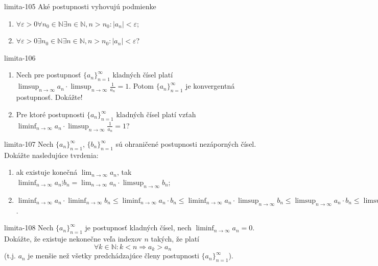 \begin{defproblem}{limita-105}
Aké postupnosti vyhovujú podmienke
\begin{enumerate}
\item $\forall \varepsilon >0 \forall n_0 \in \mathbb{N} \exists n \in \mathbb{N},n>n_0: |a_n|< \varepsilon$;
\item $\forall \varepsilon >0 \exists n_0 \in \mathbb{N} \exists n \in \mathbb{N},n>n_0: |a_n|< \varepsilon$?
\end{enumerate}
\end{defproblem}

\begin{defproblem}{limita-106}
\begin{enumerate}
\item Nech pre postupnosť ${\{a_n\}}_{n=1}^\infty$ kladných čísel platí $\limsup_{n \rightarrow \infty} a_n \cdot \limsup_{n \rightarrow \infty} \frac{1}{a_n}=1$. Potom ${\{a_n\}}_{n=1}^\infty$ je konvergentná postupnosť. Dokážte!
\item Pre ktoré postupnosti ${\{a_n\}}_{n=1}^\infty$ kladných čísel platí vzťah $\liminf_{n \rightarrow \infty} a_n \cdot \limsup_{n \rightarrow \infty} \frac{1}{a_n}=1$?
\end{enumerate}
\end{defproblem}

\begin{defproblem}{limita-107}
Nech ${\{a_n\}}_{n=1}^\infty$, ${\{b_n\}}_{n=1}^\infty$ sú ohraničené postupnosti nezáporných čísel. Dokážte nasledujúce tvrdenia:
\begin{enumerate}
\item ak existuje konečná $\lim_{n \rightarrow \infty} a_n$, tak $\liminf_{n \rightarrow \infty} a_n \vdots b_n=\lim_{n \rightarrow \infty} a_n \cdot \limsup_{n \rightarrow \infty} b_n$;
\item $\liminf_{n \rightarrow \infty} a_n \cdot \liminf_{n \rightarrow \infty} b_n \leq \liminf_{n \rightarrow \infty} a_n \cdot b_n \leq \liminf_{n \rightarrow \infty} a_n \cdot \limsup_{n \rightarrow \infty} b_n \leq \limsup_{n \rightarrow \infty} a_n \cdot b_n \leq \limsup_{n \rightarrow \infty} a_n \cdot \limsup_{n \rightarrow \infty} b_n$.
\end{enumerate}
\end{defproblem}

\begin{defproblem}{limita-108}
Nech ${\{a_n\}}_{n=1}^\infty$ je postupnosť kladných čísel, nech $\liminf_{n \rightarrow \infty} a_n =0$. Dokážte, že existuje nekonečne veľa indexov $n$ takých, že platí $$\forall k \in \mathbb{N}: k<n \Rightarrow a_k>a_n$$
(t.j. $a_n$ je menšie než všetky predchádzajúce členy postupnosti ${\{a_n\}}_{n=1}^\infty$).
\end{defproblem}

